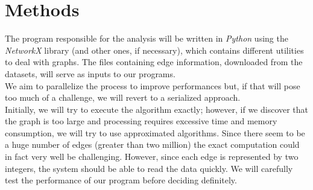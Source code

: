 \documentclass{article}
\begin{document}
\section{Methods}
The program responsible for the analysis will be written in \textit{Python} using the \textit{NetworkX} library (and other ones, if necessary), which contains different utilities to deal with graphs. The files containing edge information, downloaded from the datasets, will serve as inputs to our programs. \\
We aim to parallelize the process to improve performances but, if that will pose too much of a challenge, we will revert to a serialized approach.\\
Initially, we will try to execute the algorithm exactly; however, if we discover that the graph is too large and processing requires excessive time and memory consumption, we will try to use approximated algorithms. Since there seem to be a huge number of edges (greater than two million) the exact computation could in fact very well be challenging. However, since each edge is represented by two integers, the system should be able to read the data quickly. We will carefully test the performance of our program before deciding definitely.
\end{document}
